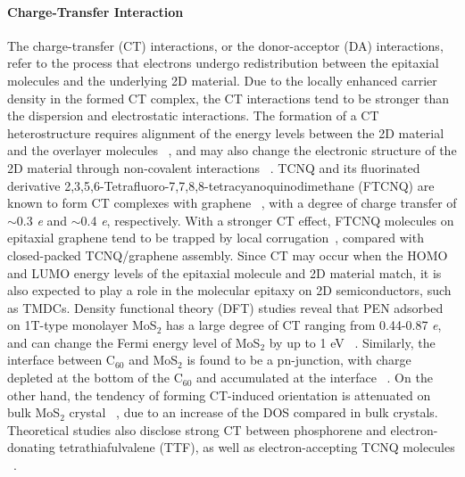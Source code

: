 \paragraph{Charge-Transfer Interaction}
\label{sec:orgebfad7b}

The charge-transfer (CT) interactions, or the donor-acceptor (DA)
interactions, refer to the process that electrons undergo
redistribution between the epitaxial molecules and the underlying 2D
material. Due to the locally enhanced carrier density in the formed CT
complex, the CT interactions tend to be stronger than the dispersion
and electrostatic interactions. The formation of a CT heterostructure
requires alignment of the energy levels between the 2D material and
the overlayer molecules ~\cite{Akiyoshi_2015_DA}, and may also change
the electronic structure of the 2D material through non-covalent
interactions
~\cite{Cai_2015_doping_2D_rev,Wehling_2008_doping,Zhang_2011_rev_pipi_gr}.
TCNQ and its fluorinated derivative
2,3,5,6-Tetra\-fluoro-7,7,8,8-tetra\-cyanoquino\-dimethane (FTCNQ) are
known to form CT complexes with graphene
~\cite{Chen_2007_tcnq_gr_transfer,Voggu_2008_TCNQ,Barja_2010_assembl_donor_gr},
with a degree of charge transfer of $\sim{}$0.3 \textit{e} and
$\sim{}$0.4 \textit{e}, respectively. With a stronger CT effect, FTCNQ
molecules on epitaxial graphene tend to be trapped by local
corrugation~\cite{Barja_2010_assembl_donor_gr}, compared with
closed-packed TCNQ/graphene assembly.  Since CT may occur when the
HOMO and LUMO energy levels of the epitaxial molecule and 2D material
match, it is also expected to play a role in the molecular epitaxy on
2D semiconductors, such as TMDCs. Density functional theory (DFT)
studies reveal that PEN adsorbed on 1T-type monolayer
MoS\(_{\text{2}}\) has a large degree of CT ranging from 0.44-0.87
\emph{e}, and can change the Fermi energy level of MoS\(_{\text{2}}\)
by up to 1 eV ~\cite{Shen_2017_DFT_mos2_pent}. Similarly, the
interface between C\(_{\text{60}}\) and MoS\(_{\text{2}}\) is found to
be a pn-junction, with charge depleted at the bottom of the
C\(_{\text{60}}\) and accumulated at the interface
~\cite{Chen_2016_c60_mos2}. On the other hand, the tendency of forming
CT-induced orientation is attenuated on bulk MoS\(_{\text{2}}\)
crystal ~\cite{Sakurai_1991_c60_mos2}, due to an increase of the DOS
compared in bulk crystals. Theoretical studies also disclose strong CT
between phosphorene and electron-donating tetrathiafulvalene (TTF), as
well as electron-accepting TCNQ molecules
~\cite{Zhang_2015_DA_phosphorene}.


